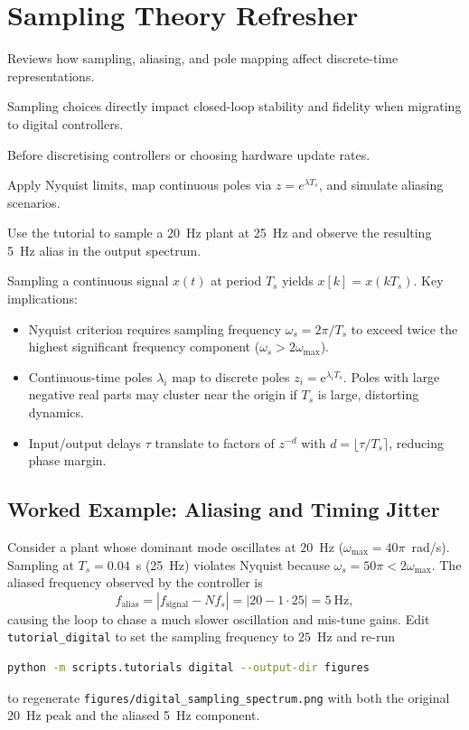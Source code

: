 \section{Sampling Theory Refresher}
\begin{beginnerguide}
    \item[\textbf{What?}] Reviews how sampling, aliasing, and pole mapping affect discrete-time representations.
    \item[\textbf{Why?}] Sampling choices directly impact closed-loop stability and fidelity when migrating to digital controllers.
    \item[\textbf{When?}] Before discretising controllers or choosing hardware update rates.
    \item[\textbf{How?}] Apply Nyquist limits, map continuous poles via $z=e^{\lambda T_s}$, and simulate aliasing scenarios.
    \item[\textbf{Example}] Use the tutorial to sample a 20~Hz plant at 25~Hz and observe the resulting 5~Hz alias in the output spectrum.
\end{beginnerguide}
Sampling a continuous signal $x(t)$ at period $T_s$ yields $x[k] = x(k T_s)$. Key implications:
\begin{itemize}[leftmargin=*]
    \item Nyquist criterion requires sampling frequency $\omega_s = 2 \pi / T_s$ to exceed twice the highest significant frequency component ($\omega_s > 2 \omega_{\max}$).
    \item Continuous-time poles $\lambda_i$ map to discrete poles $z_i = \mathrm{e}^{\lambda_i T_s}$. Poles with large negative real parts may cluster near the origin if $T_s$ is large, distorting dynamics.
    \item Input/output delays $\tau$ translate to factors of $z^{-d}$ with $d = \lfloor \tau / T_s \rceil$, reducing phase margin.
\end{itemize}
\subsection{Worked Example: Aliasing and Timing Jitter}
Consider a plant whose dominant mode oscillates at $20$~Hz ($\omega_{\max} = 40 \pi$~rad/s). Sampling at $T_s = 0.04$~s (25~Hz) violates Nyquist because $\omega_s = 50 \pi < 2 \omega_{\max}$. The aliased frequency observed by the controller is
\[
    f_\text{alias} = |f_\text{signal} - N f_s| = |20 - 1 \cdot 25| = 5~\text{Hz},
\]
causing the loop to chase a much slower oscillation and mis-tune gains. Edit \texttt{tutorial\_digital} to set the sampling frequency to $25$~Hz and re-run
\begin{lstlisting}[language=bash]
python -m scripts.tutorials digital --output-dir figures
\end{lstlisting}
to regenerate \texttt{figures/digital\_sampling\_spectrum.png} with both the original 20~Hz peak and the aliased 5~Hz component.


